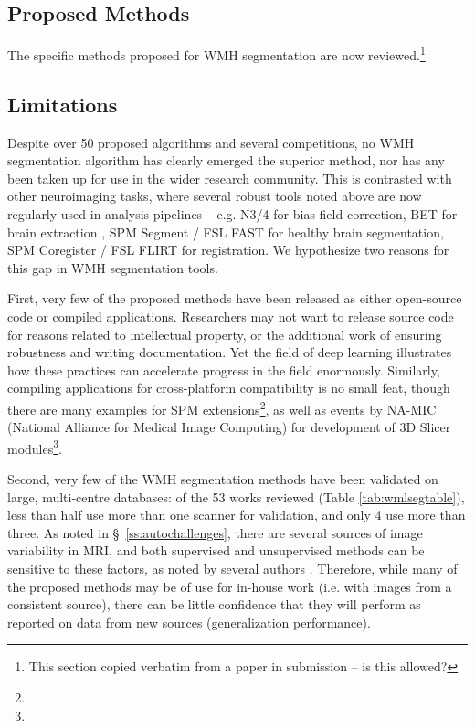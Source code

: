 \subsection{Proposed Methods}\label{ss:priorproposed}
The specific methods proposed for WMH segmentation are now reviewed.\footnote{This section copied verbatim from a paper in submission \cite{Knight2017a} -- is this allowed?}
\newcommand{\priorworksub}[1]{\subsubsection{#1}}

\subsection{Limitations}\label{ss:priorlimits}
Despite over 50 proposed algorithms and several competitions, no WMH segmentation algorithm has clearly emerged the superior method, nor has any been taken up for use in the wider research community. This is contrasted with other neuroimaging tasks, where several robust tools noted above are now regularly used in analysis pipelines -- e.g. N3/4 \cite{Tustison2010} for bias field correction, BET for brain extraction \cite{Smith2002a}, SPM Segment \cite{Ashburner2005} / FSL FAST \cite{Zhang2001} for healthy brain segmentation, SPM Coregister \cite{Ashburner2005} / FSL FLIRT \cite{Jenkinson2001} for registration. We hypothesize two reasons for this gap in WMH segmentation tools.
\par
First, very few of the proposed methods have been released as either open-source code or compiled applications. Researchers may not want to release source code for reasons related to intellectual property, or the additional work of ensuring robustness and writing documentation. Yet the field of deep learning illustrates how these practices can accelerate progress in the field enormously. Similarly, compiling applications for cross-platform compatibility is no small feat, though there are many examples for SPM extensions\footnote{}, as well as events by NA-MIC (National Alliance for Medical Image Computing) for development of 3D Slicer modules\footnote{}.
\par
Second, very few of the WMH segmentation methods have been validated on large, multi-centre databases: of the 53 works reviewed (Table \ref{tab:wmlsegtable}), less than half use more than one scanner for validation, and only 4 use more than three. As noted in \S\ \ref{ss:autochallenges}, there are several sources of image variability in MRI, and both supervised and unsupervised methods can be sensitive to these factors, as noted by several authors \cite{Llado2012,Sweeney2013,Dadar2017}. Therefore, while many of the proposed methods may be of use for in-house work (i.e. with images from a consistent source), there can be little confidence that they will perform as reported on data from new sources (generalization performance).
